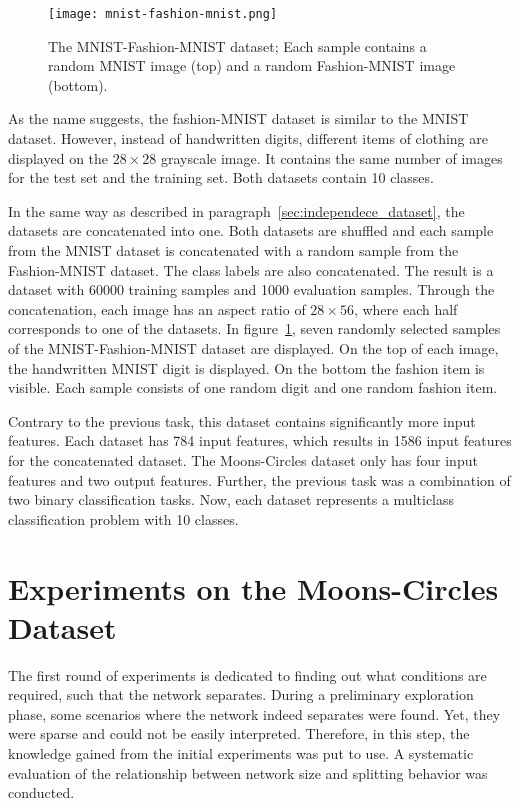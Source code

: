 \begin{figure}[ht]
    \centering\texttt{[image: mnist-fashion-mnist.png]}
    \caption[MNIST-Fashion-MNIST dataset]{
        The MNIST-Fashion-MNIST dataset; Each sample contains a random MNIST image (top) and a random Fashion-MNIST image (bottom).
    }\label{fig:mnist_fashion}
\end{figure}

As the name suggests, the fashion-MNIST dataset \autocite{fashion} is similar to the MNIST dataset.
However, instead of handwritten digits, different items of clothing are displayed on the $28 \times 28$ grayscale image.
It contains the same number of images for the test set and the training set.
Both datasets contain 10 classes.

In the same way as described in paragraph~\ref{sec:independece_dataset}, the datasets are concatenated into one.
Both datasets are shuffled and each sample from the MNIST dataset is concatenated with a random sample from the Fashion-MNIST dataset.
The class labels are also concatenated.
The result is a dataset with 60000 training samples and 1000 evaluation samples.
Through the concatenation, each image has an aspect ratio of $28 \times 56$, where each half corresponds to one of the datasets.
In figure~\ref{fig:mnist_fashion}, seven randomly selected samples of the  MNIST-Fashion-MNIST dataset are displayed.
On the top of each image, the handwritten MNIST digit is displayed. 
On the bottom the fashion item is visible.
Each sample consists of one random digit and one random fashion item. 

Contrary to the previous task, this dataset contains significantly more input features.
Each dataset has 784 input features, which results in 1586 input features for the concatenated dataset.
The Moons-Circles dataset only has four input features and two output features.
Further, the previous task was a combination of two binary classification tasks.
Now, each dataset represents a multiclass classification problem with 10 classes.

\section{Experiments on the Moons-Circles Dataset}
The first round of experiments is dedicated to finding out what conditions are required, such that the network separates.
During a preliminary exploration phase, some scenarios where the network indeed separates were found.
Yet, they were sparse and could not be easily interpreted.
Therefore, in this step, the knowledge gained from the initial experiments was put to use.
A systematic evaluation of the relationship between network size and splitting behavior was conducted.

